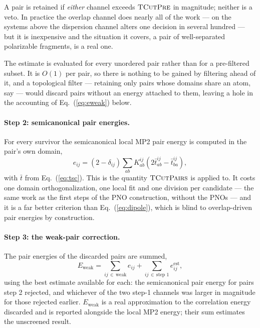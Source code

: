 \documentclass[aip,jcp,amsmath,amssymb,preprint,superscriptaddress]{revtex4-2}%
\newcommand{\TCut}[1]{\textsc{TCut#1}}
\begin{document}
A pair is retained if \emph{either} channel exceeds $\TCut{Pre}$ in magnitude;
neither is a veto. In practice the overlap channel does nearly all of the
work --- on the systems above the dispersion channel alters one decision in
several hundred --- but it is inexpensive and the situation it covers, a pair
of well-separated polarizable fragments, is a real one.

The estimate is evaluated for every unordered pair rather than for a
pre-filtered subset. It is $O(1)$ per pair, so there is nothing to be gained
by filtering ahead of it, and a topological filter --- retaining only pairs
whose domains share an atom, say --- would discard pairs without an energy
attached to them, leaving a hole in the accounting of
Eq.~(\ref{eq:eweak}) below.

\paragraph{Step 2: semicanonical pair energies.}
For every survivor the semicanonical local MP2 pair energy is computed in the
pair's own domain,
%
\begin{equation}
  e_{ij} = (2-\delta_{ij})\sum_{ab} K^{ij}_{ab}
    \left(2\bar{t}^{ij}_{ab}-\bar{t}^{ij}_{ba}\right),
  \label{eq:pairE}
\end{equation}
%
with $\bar{t}$ from Eq.~(\ref{eq:tsc}). This is the quantity $\TCut{Pairs}$ is
applied to. It costs one domain orthogonalization, one local fit and one
division per candidate --- the same work as the first steps of the PNO
construction, without the PNOs --- and it is a far better criterion than
Eq.~(\ref{eq:dipole}), which is blind to overlap-driven pair energies by
construction.

\paragraph{Step 3: the weak-pair correction.}
The pair energies of the discarded pairs are summed,
%
\begin{equation}
  E_{\text{weak}} = \sum_{ij\,\in\,\text{weak}} e_{ij}
    + \sum_{ij\,\in\,\text{step 1}} e^{\text{est}}_{ij},
  \label{eq:eweak}
\end{equation}
%
using the best estimate available for each: the semicanonical pair energy for
pairs step 2 rejected, and whichever of the two step-1 channels was larger in
magnitude for those rejected earlier. $E_{\text{weak}}$ is a real approximation to the
correlation energy discarded and is reported alongside the local MP2 energy;
their sum estimates the unscreened result.
\end{document}
